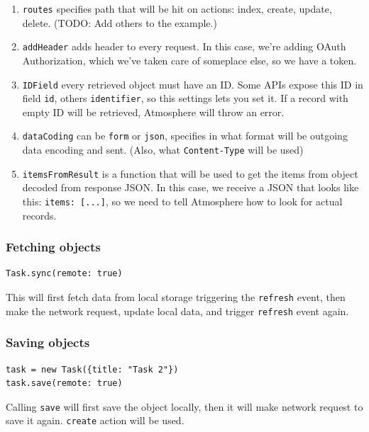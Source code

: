 \begin{enumerate}
\item \texttt{routes} specifies path that will be hit on actions: index, create, update, delete. (TODO: Add others to the example.)
\item \texttt{addHeader} adds header to every request. In this case, we're adding OAuth Authorization, which we've taken care of someplace else, so we have a token.
\item \texttt{IDField} every retrieved object must have an ID. Some APIs expose this ID in field \texttt{id}, others \texttt{identifier}, so this settings lets you set it. If a record with empty ID will be retrieved, Atmosphere will throw an error.
\item \texttt{dataCoding} can be \texttt{form} or \texttt{json}, specifies in what format will be outgoing data encoding and sent. (Also, what \texttt{Content-Type} will be used)
\item \texttt{itemsFromResult} is a function that will be used to get the items from object decoded from response JSON. In this case, we receive a JSON that looks like this: \texttt{{items: [...]}}, so we need to tell Atmosphere how to look for actual records.
\end{enumerate}


\subsubsection{Fetching objects}

\begin{lstlisting}[caption=Fetching objects]
Task.sync(remote: true)
\end{lstlisting}

This will first fetch data from local storage triggering the \texttt{refresh} event, then make the network request, update local data, and trigger \texttt{refresh} event again.

\subsubsection{Saving objects}

\begin{lstlisting}[caption=Sending objects]
task = new Task({title: "Task 2"})
task.save(remote: true)
\end{lstlisting}

Calling \texttt{save} will first save the object locally, then it will make network request to save it again. \texttt{create} action will be used.

